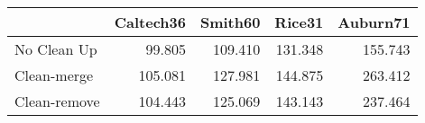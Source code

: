 \begin{tabular}{lrrrr}
\toprule
{} & Caltech36 & Smith60 &  Rice31 & Auburn71 \\
\midrule
No Clean Up  &    99.805 & 109.410 & 131.348 &  155.743 \\
Clean-merge  &   105.081 & 127.981 & 144.875 &  263.412 \\
Clean-remove &   104.443 & 125.069 & 143.143 &  237.464 \\
\bottomrule
\end{tabular}
